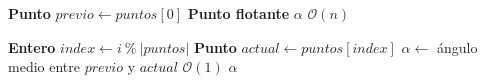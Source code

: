 \begin{algorithm}[H]
\caption{\Comment $\mathcal{O}(n)$}
\begin{algorithmic}[1]
	\State \textbf{Punto} $previo \gets puntos[0]$
	\State \textbf{Punto flotante} $\alpha$
	\State
	\Comment $\mathcal{O}(n)$

		\State \textbf{Entero} $index \gets i \ \% \ |puntos|$
		\State \textbf{Punto} $actual \gets puntos[index]$
		\Statex
			\State $\alpha \gets $ ángulo medio entre $previo$ y $actual$
			\Comment $\mathcal{O}(1)$
		\EndIf
	\EndFor
	\Statex
	\State \Return $\alpha$
\EndFunction
\end{algorithmic}
\end{algorithm}